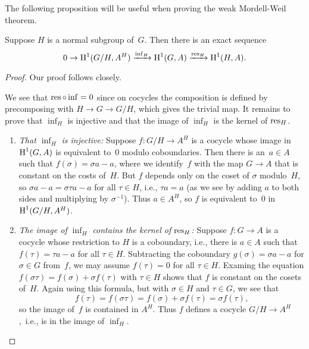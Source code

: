 The following proposition will be useful when proving
the weak Mordell-Weil theorem.
\begin{proposition}\label{prop:infres}
	Suppose $H$ is a normal subgroup of~$G$.
	Then there is an exact sequence
	$$
		0 \to \operatorname{H}^1(G/H, A^H)\xrightarrow{\operatorname{inf}_H}  \operatorname{H}^1(G,A)\xrightarrow{\operatorname{res}_H} \operatorname{H}^1(H,A).
	$$
\end{proposition}
\begin{proof}
Our proof follows \cite[pg.~117]{serre:localfields} closely.

We see that $\operatorname{res}\circ \operatorname{inf} = 0$ since on cocycles the composition is
defined by precomposing with $H\to G\to G/H$, which gives the trivial map.
It remains to prove that $\inf_H$ is injective and that the image of $\inf_H$
is the kernel of $\operatorname{res}_H$.
\begin{enumerate}
\item {\em That $\inf_H$ is injective:}
	Suppose $f:G/H\to A^H$ is a cocycle whose image in $\operatorname{H}^1(G,A)$
	is equivalent to~$0$ modulo coboundaries. Then there is an~$a\in A$
	such that $f(\sigma) = \sigma a - a$, where we identify~$f$ with
	the map $G\to A$ that is constant on the costs of~$H$. But $f$
	depends only on the coset of $\sigma$ modulo~$H$, so
	$\sigma a - a = \sigma \tau a - a$ for all $\tau \in H$, i.e.,
	$\tau a = a$ (as we see by adding $a$ to both sides and multiplying
	by $\sigma^{-1}$). Thus $a\in A^H$, so $f$ is equivalent to~$0$ in
	$\operatorname{H}^1(G/H,A^H)$.

\item {\em The image of $\inf_H$ contains the kernel of $\operatorname{res}_H$:}
	Suppose $f:G\to A$ is a cocycle whose
	restriction to $H$ is a coboundary, i.e., there is $a\in A$ such
	that $f(\tau) = \tau a - a$ for all $\tau \in H$.
	Subtracting the coboundary $g(\sigma) = \sigma a - a$ for $\sigma\in G$
	from~$f$, we may assume $f(\tau) = 0$ for all $\tau \in H$.
	Examing the equation $f(\sigma\tau) = f(\sigma) + \sigma f(\tau)$
	with $\tau\in H$ shows that $f$ is constant on the cosets of~$H$.
	Again using this formula, but with $\sigma\in H$ and $\tau\in G$, we see
	that
	$$
	  f(\tau) = f(\sigma \tau) = f(\sigma) + \sigma f(\tau) = \sigma f(\tau),
	$$
	so the image of~$f$ is contained in $A^H$.  Thus $f$ defines a cocycle
	$G/H \to A^H$,~i.e., is in the image of $\inf_H$.
\end{enumerate}
\end{proof}

